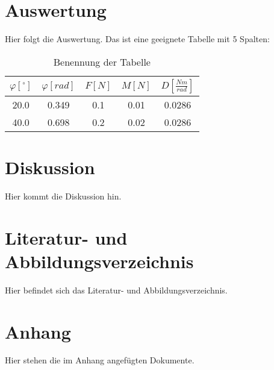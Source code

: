 \documentclass[11pt]{article}
\begin{document}
\section{Auswertung}
Hier folgt die Auswertung.
Das ist eine geeignete Tabelle mit 5 Spalten:
\begin{table}[h]
\centering
\begin{tabular}{|c|c|c|c|c|}
\hline
$\varphi[^\circ]$ & $\varphi [rad]$ & $F [N]$ & $M [N]$ & $ D [\frac{Nm}{rad}]$ \\
\hline
20.0 & 0.349 & 0.1 & 0.01 & 0.0286\\
40.0 & 0.698 & 0.2 & 0.02 & 0.0286\\
\hline
\end{tabular}
\caption{Benennung der Tabelle}
\end{table}
\section{Diskussion}
Hier kommt die Diskussion hin.
\section{Literatur- und Abbildungsverzeichnis}
Hier befindet sich das Literatur- und Abbildungsverzeichnis.
\section{Anhang}
Hier stehen die im Anhang angefügten Dokumente.
\end{document}
